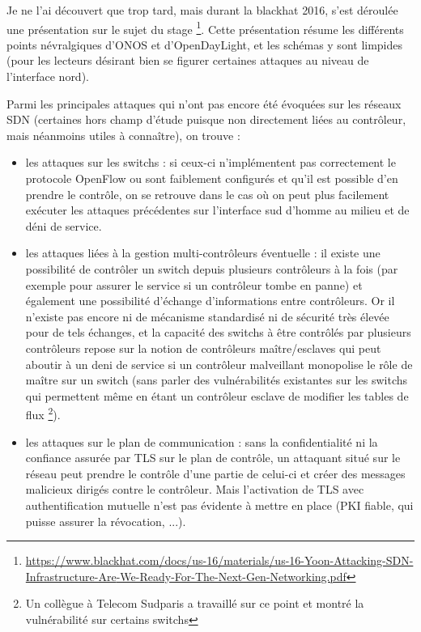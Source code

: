 Je ne l'ai découvert que trop tard, mais durant la blackhat 2016, s'est déroulée une présentation sur le sujet du stage \footnote{\url{https://www.blackhat.com/docs/us-16/materials/us-16-Yoon-Attacking-SDN-Infrastructure-Are}\newline \url{-We-Ready-For-The-Next-Gen-Networking.pdf}}. Cette présentation résume les différents points névralgiques d'ONOS et d'OpenDayLight, et les schémas y sont limpides (pour les lecteurs désirant bien se figurer certaines attaques au niveau de l'interface nord). 

Parmi les principales attaques qui n'ont pas encore été évoquées sur les réseaux SDN (certaines hors champ d'étude puisque non directement liées au contrôleur, mais néanmoins utiles à connaître), on trouve :

\begin{itemize}

\item les attaques sur les switchs : si ceux-ci n'implémentent pas correctement le protocole OpenFlow ou sont faiblement configurés et qu'il est possible d'en prendre le contrôle, on se retrouve dans le cas où on peut plus facilement exécuter les attaques précédentes sur l'interface sud d'homme au milieu et de déni de service.

\item les attaques liées à la gestion multi-contrôleurs éventuelle : il existe une possibilité de contrôler un switch depuis plusieurs contrôleurs à la fois (par exemple pour assurer le service si un contrôleur tombe en panne) et également une possibilité d'échange d'informations entre contrôleurs. Or il n'existe pas encore ni de mécanisme standardisé ni de sécurité très élevée pour de tels échanges, et la capacité des switchs à être contrôlés par plusieurs contrôleurs repose sur la notion de contrôleurs maître/esclaves qui peut aboutir à un deni de service si un contrôleur malveillant monopolise le rôle de maître sur un switch (sans parler des vulnérabilités existantes sur les switchs qui permettent même en étant un contrôleur esclave de modifier les tables de flux \footnote{Un collègue à Telecom Sudparis a travaillé sur ce point et montré la vulnérabilité sur certains switchs}).

\item les attaques sur le plan de communication : sans la confidentialité ni la confiance assurée par TLS sur le plan de contrôle, un attaquant situé sur le réseau peut prendre le contrôle d'une partie de celui-ci et créer des messages malicieux dirigés contre le contrôleur. Mais l'activation de TLS avec authentification mutuelle n'est pas évidente à mettre en place (PKI fiable, qui puisse assurer la révocation, ...).


\end{itemize}
